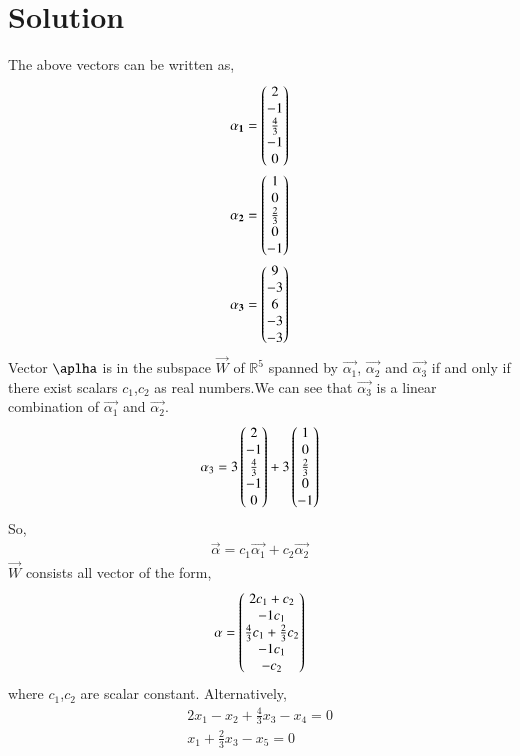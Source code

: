 \documentclass[journal,12pt,twocolumn]{IEEEtran}
\begin{document}
   \section{\textbf{Solution}}
   The above vectors can be written as,
   \begin{align}
   \mathbf{\alpha_1}=\begin{pmatrix}2\\-1\\\frac{4}{3}\\-1\\0\end{pmatrix}\\
   \mathbf{\alpha_2}=\begin{pmatrix}1\\0\\\frac{2}{3}\\0\\-1\end{pmatrix}\\
   \mathbf{\alpha_3}=\begin{pmatrix}9\\-3\\6\\-3\\-3\end{pmatrix}
   \end{align}
   Vector $\aplha$ is in the subspace $\vec{W}$ of $\mathbb{R}^5$ spanned by $\vec{\alpha_1}$, $\vec{\alpha_2}$ and $ \vec{\alpha_3}$ if and only if there exist scalars $c_1$,$c_2$ as real numbers.We can see that $\vec{\alpha_3}$ is a linear combination of $\vec{\alpha_1}$ and $\vec{\alpha_2}$.
   \begin{align}
   \mathbf{\alpha}_3=3\begin{pmatrix}2\\-1\\\frac{4}{3}\\-1\\0\end{pmatrix}+3\begin{pmatrix}1\\0\\\frac{2}{3}\\0\\-1\end{pmatrix}
   \end{align}
    So,
    \begin{align}
   \vec{\alpha}=c_1\vec{\alpha_1}+c_2\vec{\alpha_2}
   \end{align}
   $\vec{W}$ consists all vector of the form,
   \begin{align}
   \mathbf{\alpha}=\begin{pmatrix}2c_1+c_2\\-1c_1\\\frac{4}{3}c_1+\frac{2}{3}c_2\\-1c_1\\-c_2\end{pmatrix}
   \end{align}
   where $c_1$,$c_2$  are scalar constant. Alternatively,
   \begin{align}
   2x_1-x_2+\frac{4}{3}x_3-x_4=0\\
   x_1+\frac{2}{3}x_3-x_5=0
   \end{align}
\end{document}
